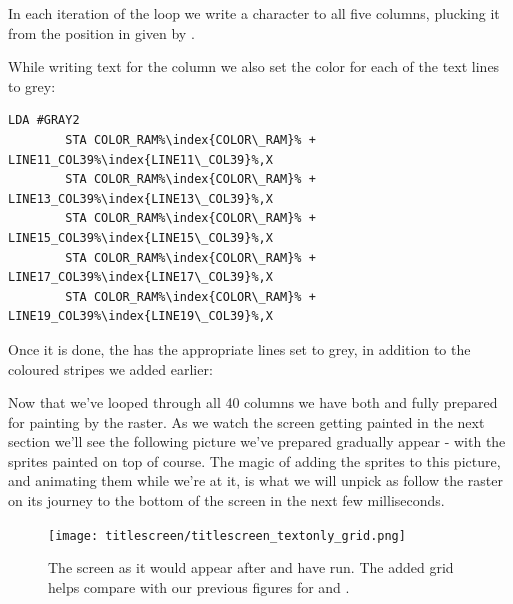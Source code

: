 In each iteration of the loop we write a character to all five columns, plucking it from the position in
 given by . 



While writing text for the column we also set the color for each of the text lines to grey:

\begin{lstlisting}[caption=In \icode{DrawTitleScreenText\index{DrawTitleScreenText}},escapechar=\%]
        LDA #GRAY2
        STA COLOR_RAM%\index{COLOR\_RAM}% + LINE11_COL39%\index{LINE11\_COL39}%,X
        STA COLOR_RAM%\index{COLOR\_RAM}% + LINE13_COL39%\index{LINE13\_COL39}%,X
        STA COLOR_RAM%\index{COLOR\_RAM}% + LINE15_COL39%\index{LINE15\_COL39}%,X
        STA COLOR_RAM%\index{COLOR\_RAM}% + LINE17_COL39%\index{LINE17\_COL39}%,X
        STA COLOR_RAM%\index{COLOR\_RAM}% + LINE19_COL39%\index{LINE19\_COL39}%,X
\end{lstlisting}

Once it is done, the  has the appropriate lines set to grey, in addition to the coloured stripes
we added earlier:


Now that we've looped through all 40 columns we have both  and  fully
prepared for painting by the raster. As we watch the screen getting painted in the next section we'll see
the following picture we've prepared gradually appear - with the sprites painted on top of course. The
magic of adding the sprites to this picture, and animating them while we're at it, is what we will
unpick as follow the raster on its journey to the bottom of the screen in the next few milliseconds.

\begin{figure}[H]
    \begin{adjustbox}{width=13cm,center}
    \texttt{[image: titlescreen/titlescreen\_textonly\_grid.png]}%
    \end{adjustbox}
  \caption{The screen as it would appear after  and  have run. The added
  grid helps compare with our previous figures for  and .}
\end{figure}


